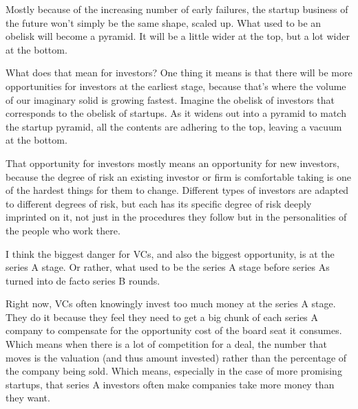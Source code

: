 Mostly because of the increasing number of early
                  failures, the startup business of the future won't simply be
                  the same shape, scaled up. What used to be an obelisk will
                  become a pyramid. It will be a little wider at the top, but a
                  lot wider at the bottom.

What does that mean for
                  investors? One thing it means is that there will be more
                  opportunities for investors at the earliest stage, because
                  that's where the volume of our imaginary solid is growing
                  fastest. Imagine the obelisk of investors that corresponds to
                  the obelisk of startups. As it widens out into a pyramid to
                  match the startup pyramid, all the contents are adhering to
                  the top, leaving a vacuum at the bottom.

That
                  opportunity for investors mostly means an opportunity for new
                  investors, because the degree of risk an existing investor or
                  firm is comfortable taking is one of the hardest things for
                  them to change. Different types of investors are adapted to
                  different degrees of risk, but each has its specific degree of
                  risk deeply imprinted on it, not just in the procedures they
                  follow but in the personalities of the people who work
                  there.

I think the biggest danger for VCs, and also
                  the biggest opportunity, is at the series A stage. Or rather,
                  what used to be the series A stage before series As turned
                  into de facto series B rounds.

Right now, VCs often
                  knowingly invest too much money at the series A stage. They do
                  it because they feel they need to get a big chunk of each
                  series A company to compensate for the opportunity cost of the
                  board seat it consumes. Which means when there is a lot of
                  competition for a deal, the number that moves is the valuation
                  (and thus amount invested) rather than the percentage of the
                  company being sold. Which means, especially in the case of
                  more promising startups, that series A investors often make
                  companies take more money than they want.

